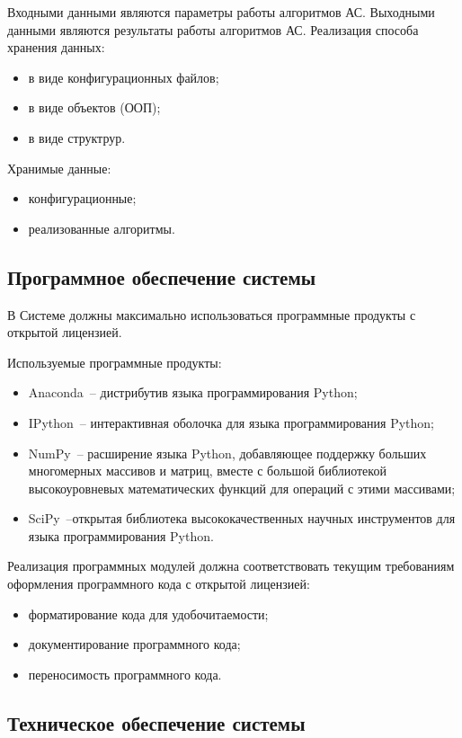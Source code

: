 Входными данными являются параметры работы алгоритмов АС. Выходными данными
являются результаты работы алгоритмов АС.
Реализация способа хранения данных:
\begin{itemize}
  \item в виде конфигурационных файлов;
  \item в виде объектов (ООП);
  \item в виде структрур.
\end{itemize}

\newpage
Хранимые данные:
\begin{itemize}
  \item конфигурационные;
  \item реализованные алгоритмы.
\end{itemize}

\subsection{Программное обеспечение системы}
В Системе должны максимально использоваться программные продукты с открытой
лицензией.

Используемые программные продукты:
\begin{itemize}
  \item Anaconda~-- дистрибутив языка программирования Python;
  \item IPython~-- интерактивная оболочка для языка программирования Python;
  \item NumPy~-- расширение языка Python, добавляющее поддержку больших
    многомерных массивов и матриц, вместе с большой библиотекой высокоуровневых
    математических функций для операций с этими массивами;
  \item SciPy~--открытая библиотека высококачественных научных инструментов для
    языка программирования Python.
\end{itemize}

Реализация программных модулей должна соответствовать текущим
требованиям оформления программного кода с открытой лицензией:
\begin{itemize}
  \item форматирование кода для удобочитаемости;
  \item документирование программного кода;
  \item переносимость программного кода.
\end{itemize}

\subsection{Техническое обеспечение системы}
